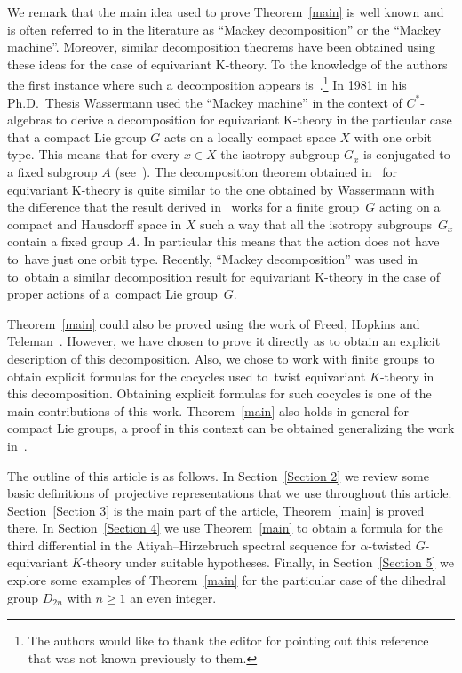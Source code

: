 \documentclass[10pt,a4paper]{amsart}
\theoremstyle{definition}
\numberwithin{equation}{section}
\begin{document}
We remark that the main idea used to prove Theorem~\ref{main} is well known and is often referred
to in the literature as ``Mackey decomposition'' or the ``Mackey machine''. Moreover, similar decomposition
theorems have been obtained using these ideas for the case of equivariant K-theory. To the knowledge of
the authors the first instance where such a decomposition appears is~\cite{Wassermann}.\footnote{The authors would like to thank the editor for pointing out this reference that was not
known previously to them.} In 1981 in his Ph.D.~Thesis Wassermann used the ``Mackey machine'' in
the context of $C^{*}$-algebras to derive a decomposition for equivariant K-theory in the particular
case that a compact Lie group $G$ acts on a locally compact space $X$ with one orbit type.
This means that for every $x\in X$ the isotropy subgroup $G_{x}$ is conjugated to a fixed subgroup $A$
(see~\cite[Theorem~7]{Wassermann}). The decomposition theorem obtained in~\cite{GomezUribe} for equivariant
K-theory is quite similar to the one obtained by Wassermann with the difference that the result derived in~\cite{GomezUribe} works for a finite group~$G$ acting on a compact and Hausdorff space in $X$ such a
way that all the isotropy subgroups~$G_{x}$ contain a fixed group $A$. In particular this means that
the action does not have to~have just one orbit type. Recently, ``Mackey decomposition'' was used in~\cite{ABV}
to~obtain a similar decomposition result for equivariant K-theory in the case of proper actions of a~compact Lie
group~$G$.

Theorem~\ref{main} could also be proved using the work of Freed, Hopkins and
Teleman~\cite{FHT}. However, we have chosen to prove it directly as to obtain an explicit
description of this decomposition. Also, we chose to work with finite groups to obtain explicit
formulas for the cocycles used to~twist equivariant $K$-theory in this decomposition.
Obtaining explicit formulas for such cocycles is one of the main contributions of this
work. Theorem~\ref{main} also holds in general for compact Lie groups, a proof in this context can be
obtained generalizing the work in~\cite{AGU}.

The outline of this article is as follows. In Section~\ref{Section 2} we review some basic definitions
of~pro\-jec\-tive representations that we use throughout this article. Section~\ref{Section 3} is
the main part of the article, Theorem~\ref{main} is proved there. In Section~\ref{Section 4}
we use Theorem~\ref{main} to obtain a formula for the third differential in the
Atiyah--Hirzebruch spectral sequence for $\alpha$-twisted $G$-equivariant $K$-theory
under suitable hypotheses. Finally, in Section~\ref{Section 5} we explore some examples of
Theorem~\ref{main} for the particular case of the dihedral group $D_{2n}$ with $n\ge 1$ an even integer.
\end{document}

